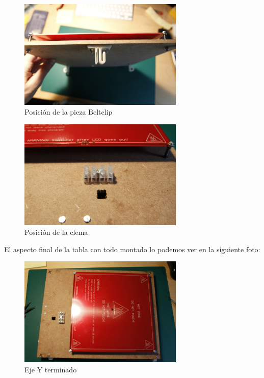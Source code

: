 		\begin{figure}[H]
			\centering
			\includegraphics[width=0.7\textwidth]{../../Fotos/41.jpg}
			\caption{Posición de la pieza Beltclip}
			\label{fig:beltclip}
		\end{figure}
		\begin{figure}[H]
			\centering
			\includegraphics[width=0.7\textwidth]{../../Fotos/42.jpg}
			\caption{Posición de la clema}
			\label{fig:clema}
		\end{figure}
	El aspecto final de la tabla con todo montado lo podemos ver en la siguiente foto:
		\begin{figure}[H]
			\centering
			\includegraphics[width=0.7\textwidth]{../../Fotos/43.jpg}
			\caption{Eje Y terminado}
			\label{fig:eje.y}
		\end{figure}
